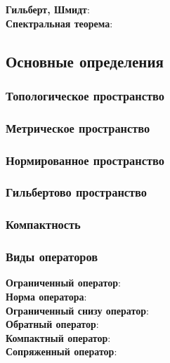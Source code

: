 \documentclass[12pt,a4paper]{scrartcl}
\begin{document}
\textbf{Гильберт, Шмидт}: \\

\textbf{Спектральная теорема}: \\

\newpage
\subsection*{Основные определения}

\subsubsection*{Топологическое пространство}

\subsubsection*{Метрическое пространство}

\subsubsection*{Нормированное пространство}

\subsubsection*{Гильбертово пространство}

\subsubsection*{Компактность}

\subsubsection*{Виды операторов}

\textbf{Ограниченный оператор}: \\

\textbf{Норма оператора}:\\

\textbf{Ограниченный снизу оператор}: \\

\textbf{Обратный оператор}: \\

\textbf{Компактный оператор}: \\

\textbf{Сопряженный оператор}: \\ 
\end{document}
